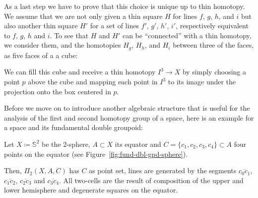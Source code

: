 \begin{defn}
As a last step we have to prove that this choice is unique up to thin homotopy.
We assume that we are not only given a thin square $H$ for
lines $f$, $g$, $h$, and $i$ but also another thin square $H'$ for a set of lines
$f'$, $g'$, $h'$, $i'$, respectively equivalent to $f$, $g$, $h$ and $i$.
To see that $H$ and $H'$ can be ``connected'' with a thin homotopy,
we consider them, and the homotopies $H_g$, $H_h$, and $H_i$ between three of the faces,
as five faces of a a cube:

\begin{center}
\end{center}

We can fill this cube and receive a thin homotopy $I^3 \to X$ by simply choosing
a point $p$ above the cube and mapping each point in $I^3$ to its image under the
projection onto the box centered in $p$.
\end{defn}

Before we move on to introduce another algebraic structure that is useful for
the analysis of the first and second homotopy group of a space, here is an example
for a space and its fundamental double groupoid:

\begin{example} \label{example:fdblgpd-sphere}
Let $X \coloneqq \mathbb{S}^2$ be the 2-sphere, $A \subset X$ its equator and
$C = \{c_1, c_2, c_3, c_4\} \subset A$ four points on the equator (see
Figure~\ref{fig:fund-dbl-gpd-sphere}).

Then, $\Pi_2(X, A, C)$ has $C$ as point set, lines are generated by the segments
$\overline{c_0 c_1}$, $\overline{c_1 c_2}$, $\overline{c_2 c_3}$ and
$\overline{c_3 c_4}$.
All two-cells are the result of composition of the upper and lower hemisphere
and degenerate squares on the equator.
\end{example}

